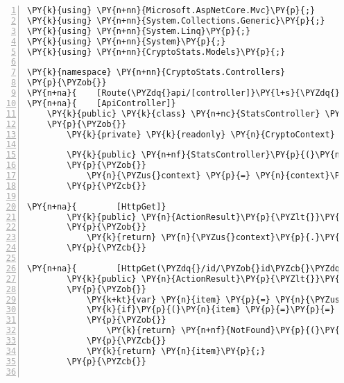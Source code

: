 \def\PYZbs{\char`\\}
\def\PYZus{\char`\_}
\def\PYZob{\char`\{}
\def\PYZcb{\char`\}}
\def\PYZca{\char`\^}
\def\PYZam{\char`\&}
\def\PYZlt{\char`\<}
\def\PYZgt{\char`\>}
\def\PYZsh{\char`\#}
\def\PYZpc{\char`\%}
\def\PYZdl{\char`\$}
\def\PYZhy{\char`\-}
\def\PYZsq{\char`\'}
\def\PYZdq{\char`\"}
\def\PYZti{\char`\~}
\def\PYZat{@}
\def\PYZlb{[}
\def\PYZrb{]}
\makeatother\begin{Verbatim}[commandchars=\\\{\},numbers=left,firstnumber=1,stepnumber=1,numberblanklines=0]
\PY{k}{using} \PY{n+nn}{Microsoft.AspNetCore.Mvc}\PY{p}{;}
\PY{k}{using} \PY{n+nn}{System.Collections.Generic}\PY{p}{;}
\PY{k}{using} \PY{n+nn}{System.Linq}\PY{p}{;}
\PY{k}{using} \PY{n+nn}{System}\PY{p}{;}
\PY{k}{using} \PY{n+nn}{CryptoStats.Models}\PY{p}{;}

\PY{k}{namespace} \PY{n+nn}{CryptoStats.Controllers}
\PY{p}{\PYZob{}}
\PY{n+na}{    [Route(\PYZdq{}api/[controller]}\PY{l+s}{\PYZdq{})]}
\PY{n+na}{    [ApiController]}
    \PY{k}{public} \PY{k}{class} \PY{n+nc}{StatsController} \PY{p}{:} \PY{n}{ControllerBase}
    \PY{p}{\PYZob{}}
        \PY{k}{private} \PY{k}{readonly} \PY{n}{CryptoContext} \PY{n}{\PYZus{}context}\PY{p}{;}

        \PY{k}{public} \PY{n+nf}{StatsController}\PY{p}{(}\PY{n}{CryptoContext} \PY{n}{context}\PY{p}{)}
        \PY{p}{\PYZob{}}
            \PY{n}{\PYZus{}context} \PY{p}{=} \PY{n}{context}\PY{p}{;}
        \PY{p}{\PYZcb{}}

\PY{n+na}{        [HttpGet]}
        \PY{k}{public} \PY{n}{ActionResult}\PY{p}{\PYZlt{}}\PY{n}{List}\PY{p}{\PYZlt{}}\PY{n}{Stat}\PY{p}{\PYZgt{}}\PY{p}{\PYZgt{}} \PY{n}{GetAll}\PY{p}{(}\PY{p}{)}
        \PY{p}{\PYZob{}}
            \PY{k}{return} \PY{n}{\PYZus{}context}\PY{p}{.}\PY{n}{Stats}\PY{p}{.}\PY{n}{ToList}\PY{p}{(}\PY{p}{)}\PY{p}{;}
        \PY{p}{\PYZcb{}}

\PY{n+na}{        [HttpGet(\PYZdq{}/id/\PYZob{}id\PYZcb{}\PYZdq{})]}
        \PY{k}{public} \PY{n}{ActionResult}\PY{p}{\PYZlt{}}\PY{n}{Stat}\PY{p}{\PYZgt{}} \PY{n}{GetById}\PY{p}{(}\PY{k+kt}{int} \PY{n}{id}\PY{p}{)}
        \PY{p}{\PYZob{}}
            \PY{k+kt}{var} \PY{n}{item} \PY{p}{=} \PY{n}{\PYZus{}context}\PY{p}{.}\PY{n}{Stats}\PY{p}{.}\PY{n}{Find}\PY{p}{(}\PY{n}{id}\PY{p}{)}\PY{p}{;}
            \PY{k}{if}\PY{p}{(}\PY{n}{item} \PY{p}{=}\PY{p}{=} \PY{k}{null}\PY{p}{)}
            \PY{p}{\PYZob{}}
                \PY{k}{return} \PY{n+nf}{NotFound}\PY{p}{(}\PY{p}{)}\PY{p}{;}
            \PY{p}{\PYZcb{}}
            \PY{k}{return} \PY{n}{item}\PY{p}{;}
        \PY{p}{\PYZcb{}}


\end{Verbatim}
